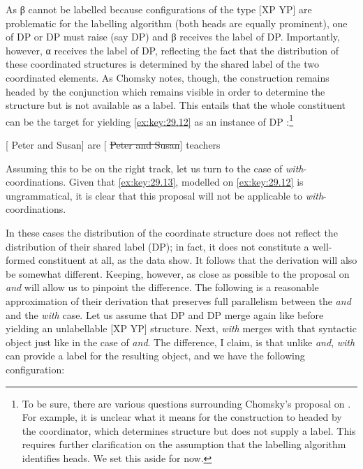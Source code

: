 \documentclass[output=paper]{langsci/langscibook}
\begin{document}
As β cannot be labelled because configurations of the type [XP YP] are
problematic for the labelling algorithm (both heads are equally prominent), one
of DP or DP must raise (say DP) and β receives the label
of DP. Importantly, however, α receives the label of DP,
reflecting the fact that the distribution of these coordinated structures is
determined by the shared label of the two coordinated elements. As Chomsky
notes, though, the construction remains headed by the conjunction which remains
visible in order to determine the structure but is not available as a label.
This entails that the whole constituent can be the target for  yielding
\eqref{ex:key:29.12} as an instance of DP :\footnote{To be sure, there are various
questions surrounding Chomsky's proposal on . For example, it is
unclear what it means for the construction to headed by the coordinator, which
determines structure but does not supply a label. This requires further
clarification on the assumption that the labelling algorithm identifies heads.
We set this aside for now.}

\ea\label{ex:key:29.12}
    {}[ Peter and Susan] are [\sout{ Peter and Susan}] teachers
\z

Assuming this to be on the right track, let us turn to the case of
\emph{with}-coordinations. Given that \eqref{ex:key:29.13}, modelled on
\eqref{ex:key:29.12} is ungrammatical, it is clear that this proposal will not
be applicable to \emph{with}-coordinations.

\label{ex:key:29.13}
\z

In these cases the distribution of the coordinate structure does not reflect
the distribution of their shared label (DP); in fact, it does not constitute a
well-formed constituent at all, as the data show. It follows that the derivation
will also be somewhat different. Keeping, however, as close as possible to the
proposal on \emph{and} will allow us to pinpoint the difference. The following
is a reasonable approximation of their derivation that preserves full
parallelism between the \emph{and} and the \emph{with} case. Let us assume that
DP and DP merge again like before yielding an unlabellable [XP YP]
structure. Next, \emph{with} merges with that syntactic object just like in the
case of \emph{and}. The difference, I claim, is that unlike \emph{and},
\emph{with} can provide a label for the resulting object, and we have the
following configuration:
\end{document}
